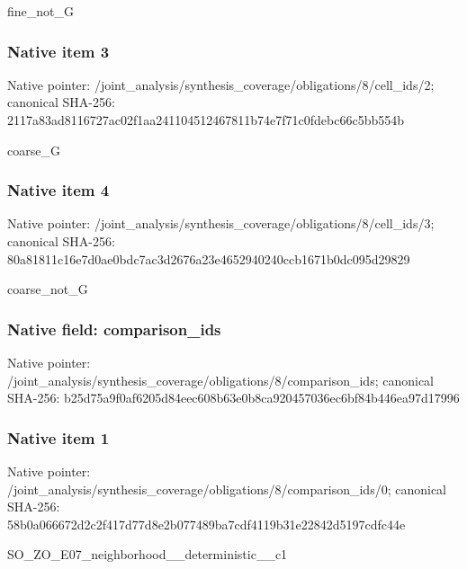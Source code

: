 \documentclass[10pt,a4paper]{article}
\begin{document}
\begingroup\raggedright\sloppy fine\_\allowbreak{}not\_\allowbreak{}G\par\endgroup

\subsubsection{Native item 3}
Native pointer: /joint\_\allowbreak{}analysis/synthesis\_\allowbreak{}coverage/obligations/8/cell\_\allowbreak{}ids/2; canonical SHA-256: 2117a83ad8116727ac02f1aa241104512467811b74e7f71c0fdebc66c5bb554b

\begingroup\raggedright\sloppy coarse\_\allowbreak{}G\par\endgroup

\subsubsection{Native item 4}
Native pointer: /joint\_\allowbreak{}analysis/synthesis\_\allowbreak{}coverage/obligations/8/cell\_\allowbreak{}ids/3; canonical SHA-256: 80a81811c16e7d0ae0bdc7ac3d2676a23e4652940240ccb1671b0dc095d29829

\begingroup\raggedright\sloppy coarse\_\allowbreak{}not\_\allowbreak{}G\par\endgroup

\subsubsection{Native field: comparison\_\allowbreak{}ids}
Native pointer: /joint\_\allowbreak{}analysis/synthesis\_\allowbreak{}coverage/obligations/8/comparison\_\allowbreak{}ids; canonical SHA-256: b25d75a9f0af6205d84eec608b63e0b8ca920457036ec6bf84b446ea97d17996

\subsubsection{Native item 1}
Native pointer: /joint\_\allowbreak{}analysis/synthesis\_\allowbreak{}coverage/obligations/8/comparison\_\allowbreak{}ids/0; canonical SHA-256: 58b0a066672d2c2f417d77d8e2b077489ba7cdf4119b31e22842d5197cdfc44e

\begingroup\raggedright\sloppy SO\_\allowbreak{}ZO\_\allowbreak{}E07\_\allowbreak{}neighborhood\_\allowbreak{}\_\allowbreak{}deterministic\_\allowbreak{}\_\allowbreak{}c1\par\endgroup
\end{document}
